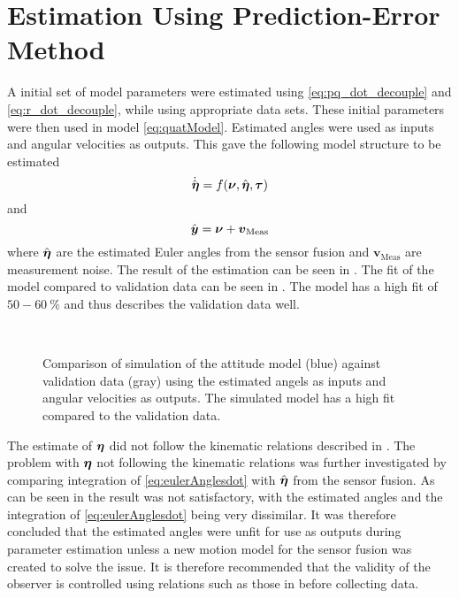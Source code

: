 \section{Estimation Using Prediction-Error Method}
A initial set of model parameters were estimated using \eqref{eq:pq_dot_decouple} and \eqref{eq:r_dot_decouple}, while using appropriate data sets. These initial parameters were then used in model \eqref{eq:quatModel}. Estimated angles were used as inputs and angular velocities as outputs. This gave the following model structure to be estimated
\begin{equation}
\dot{\hat{\boldsymbol{\eta}}} = f(\boldsymbol{\nu}, \hat{\boldsymbol{\eta}}, \boldsymbol{\tau})
\end{equation}
and
\begin{equation}
\hat{\boldsymbol{y}} = \boldsymbol{\nu} + \boldsymbol{v}_{\text{Meas}}
\end{equation}
where $\hat{\boldsymbol{\eta}}$ are the estimated Euler angles from the sensor fusion and $\boldsymbol{v}_{\text{Meas}}$ are measurement noise.
The result of the estimation can be seen in .  The fit of the model compared to validation data can be seen in . The model has a high fit of $50-60\ \%$ and thus describes the validation data well.
\begin{figure}[tbp]
  \centering
  \qquad
  \\
  \caption{\label{fig:velocityCompareCong}%
    Comparison of simulation of the attitude model (blue) against validation data (gray) using the estimated angels as inputs and angular velocities as outputs. The simulated model has a high fit compared to the validation data.}
\end{figure}

The estimate of $\boldsymbol{\eta}$ did not follow the kinematic relations described in . The problem with $\boldsymbol{\eta}$ not following the kinematic relations was further investigated by comparing integration of \eqref{eq:eulerAnglesdot} with $\hat{\boldsymbol{\eta}}$ from the sensor fusion. As can be seen in  the result was not satisfactory, with the estimated angles and the integration of \eqref{eq:eulerAnglesdot} being very dissimilar. It was therefore concluded that the estimated angles were unfit for use as outputs during parameter estimation unless a new motion model for the sensor fusion was created to solve the issue. It is therefore recommended that the validity of the observer is controlled using relations such as those in  before collecting data. 

